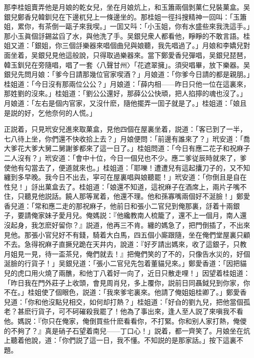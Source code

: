 那李桂姐賣弄他是月娘的乾女兒，坐在月娘炕上，和玉簫兩個剝菓仁兒裝菓盒。吴銀兒鄭香兒韓釧兒在下邊杌兒上一條邊坐的。那桂姐一徑抖搜精神一回叫：「玉簫姐，累你，有茶倒一甌子來我喫。」一囬又呌：「小玉姐，你有水盛些來我洗這手。」那小玉眞個㧱錫盆舀了水，與他洗了手。吴銀兒衆人都看他，睜睜的不敢言語。桂姐又道：「銀姐，你三個㧱樂器來唱個曲兒與娘聽，我先唱過了。」月娘和李嬌兒對面坐着，吴銀兒見他這般說，只得取過樂器來。當下鄭愛香兒彈唱，吴銀兒琵琶，韓玉釧兒在旁隨唱，唱了一套〈八聲甘州〉「花遮翠擁」。須臾唱畢，放下樂器。吴銀兒先問月娘：「爹今日請那幾位官家喫酒？」月娘道：「你爹今日請的都是親朋。」桂姐道：「今日沒有那兩位公公？」月娘道：「薛内相——昨日只他一位在這裏來，那姓劉的沒來。」桂姐道：「劉公公還好，那薛公公快頑，把人掐擰的魂也沒了。」月娘道：「左右是個内官家，又沒什麽，隨他擺弄一囬子就是了。」桂姐道：「娘且是説的好，乞他奈何的人慌。」

正説着，只見玳安兒進來取菓盒，見他四個在屋裏坐着，説道：「客已到了一半，七八待上坐，你們還不快收拾上去？」月娘便問：「前邊有誰來了？」玳安道：「喬大爹花大爹大舅二舅謝爹都來了這一日了。」桂姐問道：「今日有應二花子和祝麻子二人沒有？」玳安道：「會中十位，今日一個兒也不少。應二爹従辰時就來了，爹使他有勾當去了，便道就來也。」桂姐道：「耶嚛！遭遭兒有這起攮刀子的，又不知纏到多早晚。我今日不出去，寜可在屋裏唱與娘聽罷！」玳安道：「你倒且是自在性兒！」㧱出菓盒去了。桂姐道：「娘還不知道，這祝麻子在酒席上，兩片子嘴不住，只聽見他説話。饒人那等駡着，他還不理。他和孫寡嘴兩個好不涎臉！」鄭愛香兒道：「常和應二走的那祝麻子，他前日和張小二官兒到俺那裏，㧱着十兩銀子，要請俺家妹子愛月兒。俺媽説：『他纔教南人梳籠了，還不上一個月，南人還沒起身，我怎麽好留你？』説道，他再三不肯。纏的媽急了，把門倒插了，不出來見他。那張小官兒好不有錢，騎着大白馬，四五個小廝跟隨，坐在俺們堂屋裏只顧不去。急得祝麻子直撅兒跪在天井内，說道：『好歹請出媽來，收了這銀子，只教月姐見一見，待一盃茶兒，俺們就去！』把俺們笑的了不的，只像告水災的，好個涎臉的行貨子！」吴銀兒道：「張小二官兒先包着董貓兒來。」鄭愛香道：「因把貓兒的虎口用火燒了兩醮，和他丁八着好一向了，近日只散走哩！」因望着桂姐道：「昨日我在門外莊子上收頭，會見周肖兒，多上覆你，説前日同聶鉞兒到你家，你不在。」桂姐使了個眼色，説道：「我來爹宅裏來。他請了俺姐姐桂卿了。」鄭愛香兒道：「你和他沒點兒相交，如何却打熱？」桂姐道：「好㒲的劉九兒，把他當個孤老？甚麽行貨子，可不砢磪殺我罷了！他為了事出來，逢人至人説了來嗔我不看他。媽説：『你只在俺家，俺倒買些什麽看看你，不打緊。你和别人家打熱，俺儍的不夠了？』真是硝子石望着南兒——丁口心！」説着，都一齊笑了。月娘坐在炕上聽着他說，道：「你們説了這一日，我不懂。不知説的是那家話。」按下這裏不題。

